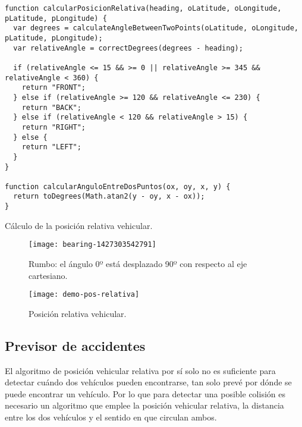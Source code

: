 \begin{listing}
	\begin{minipage}{.4\textwidth}
		\begin{verbatim}
function calcularPosicionRelativa(heading, oLatitude, oLongitude, pLatitude, pLongitude) {
  var degrees = calculateAngleBetweenTwoPoints(oLatitude, oLongitude, pLatitude, pLongitude);
  var relativeAngle = correctDegrees(degrees - heading);

  if (relativeAngle <= 15 && >= 0 || relativeAngle >= 345 && relativeAngle < 360) {
    return "FRONT";
  } else if (relativeAngle >= 120 && relativeAngle <= 230) {
    return "BACK";
  } else if (relativeAngle < 120 && relativeAngle > 15) {
    return "RIGHT";
  } else {
    return "LEFT";
  }
}

function calcularAnguloEntreDosPuntos(ox, oy, x, y) {
  return toDegrees(Math.atan2(y - oy, x - ox));
}
		\end{verbatim}
	\end{minipage}
	\caption{Cálculo de la posición relativa vehicular.}\label{alg:relative_vehicular_pos}
\end{listing}

\begin{figure}[H]
		\begin{center}
			\texttt{[image: bearing-1427303542791]}
			\caption{Rumbo: el ángulo 0º está desplazado 90º con respecto al eje cartesiano.}
			\label{figure:rumbo_gps}
		\end{center}
\end{figure}
\begin{figure}[H]
		\begin{center}
			\texttt{[image: demo-pos-relativa]}
			\caption{Posición relativa vehicular.}
			\label{figure:demo_pos_relativa}
		\end{center}
\end{figure}

\subsection{Previsor de accidentes}
El algoritmo de posición vehicular relativa por sí solo no es suficiente para detectar
cuándo dos vehículos pueden encontrarse, tan solo prevé por dónde se puede encontrar
un vehículo. Por lo que para detectar una posible colisión es necesario un algoritmo
que emplee la posición vehicular relativa, la distancia entre los dos vehículos y el
sentido en que circulan ambos.

